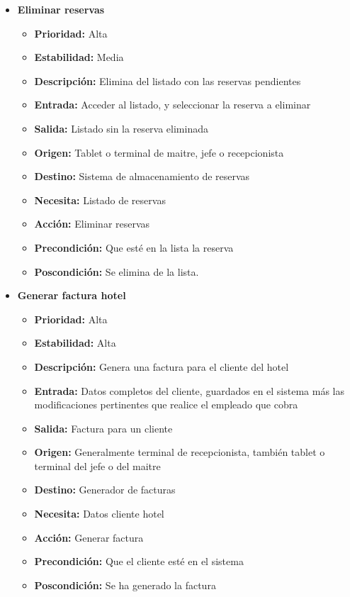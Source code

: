 \documentclass[spanish,a4paper,11pt, twoside]{report}	%
\begin{document}
\begin{itemize}
\begin{itemize}
		\end{itemize}%
		\item \textbf{ Eliminar reservas} 

		\begin{itemize}

			\item \textbf{Prioridad: }Alta
			\item \textbf{Estabilidad: }Media
			\item \textbf{Descripción: }Elimina del listado con las reservas pendientes
			\item \textbf{Entrada: }Acceder al listado, y seleccionar la reserva a eliminar
			\item \textbf{Salida: }Listado sin la reserva eliminada
			\item \textbf{Origen: }Tablet o terminal de maitre, jefe o recepcionista
			\item \textbf{Destino: }Sistema de almacenamiento de reservas
			\item \textbf{Necesita: } Listado de reservas
			\item \textbf{Acción: }Eliminar reservas
			\item \textbf{Precondición: }Que esté en la lista la reserva
			\item \textbf{Poscondición: } Se elimina de la lista.

		\end{itemize}%

		\item \textbf{Generar factura hotel} 

		\begin{itemize}

			\item \textbf{Prioridad: }Alta
			\item \textbf{Estabilidad: }Alta
			\item \textbf{Descripción: }Genera  una factura para el cliente del hotel
			\item \textbf{Entrada: }Datos completos del cliente, guardados en el sistema más las modificaciones pertinentes que realice el empleado que cobra
			\item \textbf{Salida: }Factura para un cliente
			\item \textbf{Origen: }Generalmente terminal de recepcionista, también tablet o terminal del jefe o del maitre
			\item \textbf{Destino: }Generador de facturas
			\item \textbf{Necesita: }Datos cliente hotel
			\item \textbf{Acción: }Generar factura
			\item \textbf{Precondición: }Que el cliente esté en el sistema
			\item \textbf{Poscondición: }Se ha generado la factura


\end{itemize}
\end{itemize}
\end{document}
